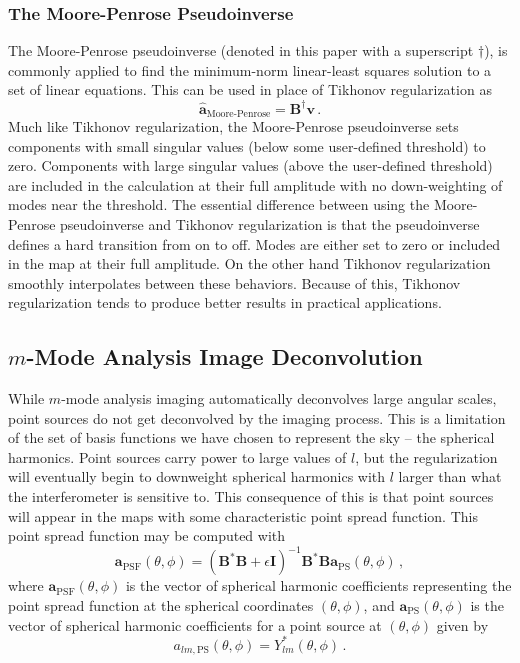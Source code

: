 \documentclass[twocolumn]{aastex6}
\renewcommand{\b}{\pmb}
\begin{document}
\subsubsection{The Moore-Penrose Pseudoinverse}

The Moore-Penrose pseudoinverse (denoted in this paper with a superscript $\dagger$), is commonly
applied to find the minimum-norm linear-least squares solution to a set of linear equations. This
can be used in place of Tikhonov regularization as
\begin{equation}
    \b{\hat a}_\text{Moore-Penrose} = \b B^\dagger\b v\,.
\end{equation}
Much like Tikhonov regularization, the Moore-Penrose pseudoinverse sets components with small
singular values (below some user-defined threshold) to zero. Components with large singular values
(above the user-defined threshold) are included in the calculation at their full amplitude with no
down-weighting of modes near the threshold. The essential difference between using the Moore-Penrose
pseudoinverse and Tikhonov regularization is that the pseudoinverse defines a hard transition from
on to off. Modes are either set to zero or included in the map at their full amplitude. On the other
hand Tikhonov regularization smoothly interpolates between these behaviors. Because of this,
Tikhonov regularization tends to produce better results in practical applications.

\subsection{$m$-Mode Analysis Image Deconvolution}

While $m$-mode analysis imaging automatically deconvolves large angular scales, point sources do not
get deconvolved by the imaging process. This is a limitation of the set of basis functions we have
chosen to represent the sky -- the spherical harmonics. Point sources carry power to large values of
$l$, but the regularization will eventually begin to downweight spherical harmonics with $l$ larger
than what the interferometer is sensitive to. This consequence of this is that point sources will
appear in the maps with some characteristic point spread function. This point spread function may be
computed with
\begin{equation}
    \b a_\text{PSF}(\theta, \phi)
        = (\b B^*\b B + \epsilon\b I)^{-1}\b B^*\b B\b a_\text{PS}(\theta, \phi)\,,
\end{equation}
where $\b a_\text{PSF}(\theta, \phi)$ is the vector of spherical harmonic coefficients representing
the point spread function at the spherical coordinates $(\theta, \phi)$, and $\b a_\text{PS}(\theta,
\phi)$ is the vector of spherical harmonic coefficients for a point source at $(\theta, \phi)$ given
by
\begin{equation}
    a_{lm, \text{PS}}(\theta, \phi) = Y_{lm}^*(\theta, \phi)\,.
\end{equation}
\end{document}
